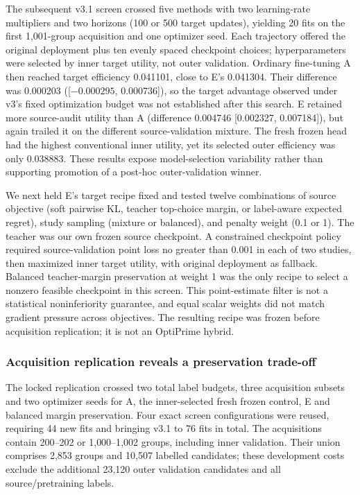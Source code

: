 The subsequent v3.1 screen crossed five methods with two learning-rate
multipliers and two horizons (100 or 500 target updates), yielding 20 fits on
the first 1{,}001-group acquisition and one optimizer seed. Each trajectory
offered the original deployment plus ten evenly spaced checkpoint choices;
hyperparameters were selected by inner target utility, not outer validation.
Ordinary fine-tuning A then reached target efficiency 0.041101, close to E's
0.041304. Their difference was 0.000203
([${-}0.000295$, 0.000736]), so the target advantage observed under v3's fixed
optimization budget was not established after this search. E retained more
source-audit utility than A (difference 0.004746 [0.002327, 0.007184]), but again
trailed it on the different source-validation mixture. The fresh frozen head
had the highest conventional inner utility, yet its selected outer efficiency
was only 0.038883. These results expose model-selection variability rather than
supporting promotion of a post-hoc outer-validation winner.

We next held E's target recipe fixed and tested twelve combinations of source
objective (soft pairwise KL, teacher top-choice margin, or label-aware expected
regret), study sampling (mixture or balanced), and penalty weight (0.1 or 1).
The teacher was our own frozen source checkpoint. A constrained checkpoint
policy required source-validation point loss no greater than 0.001 in each of
two studies, then maximized inner target utility, with original deployment as
fallback. Balanced teacher-margin preservation at weight 1 was the only recipe
to select a nonzero feasible checkpoint in this screen. This point-estimate
filter is not a statistical noninferiority guarantee, and equal scalar weights
did not match gradient pressure across objectives. The resulting recipe was
frozen before acquisition replication; it is not an OptiPrime hybrid.

\subsubsection{Acquisition replication reveals a preservation trade-off}

The locked replication crossed two total label budgets, three acquisition
subsets and two optimizer seeds for A, the inner-selected fresh frozen control,
E and balanced margin preservation. Four exact screen configurations were
reused, requiring 44 new fits and bringing v3.1 to 76 fits in total. The
acquisitions contain 200--202 or 1{,}000--1{,}002 groups, including inner
validation. Their union comprises 2{,}853 groups and 10{,}507 labelled
candidates; these development costs exclude the additional 23{,}120 outer
validation candidates and all source/pretraining labels.


